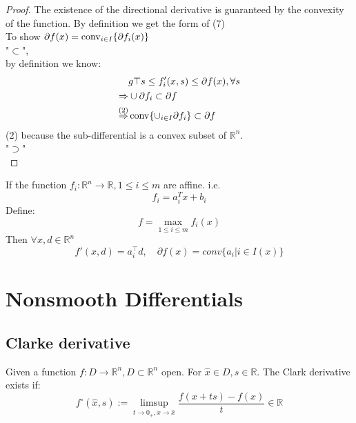 \begin{proof}
The existence of the directional derivative is guaranteed by the convexity of the function. By definition we get the form of (7)\\
To show $\partial f(x) = \operatorname*{conv}_{i \in I} \{ \partial f_i(x) \}$\\
"$\subset$", \\
by definition we know:
\begin{align*}
	&g\top s \leq f_i'(x, s) \leq \partial f(x), \forall s\\
	\Rightarrow & \cup \partial f_i \subset \partial f\\
	\overset{(2)}{\Rightarrow} & \operatorname*{conv}\{\cup_{i \in I} \partial f_i \} \subset \partial f
\end{align*}
(2) because the sub-differential is a convex subset of $\mathbb{R}^n$.\\
"$\supset$"\\
\end{proof}

\begin{corollary}
If the function $f_i:\mathbb{R}^n \longrightarrow \mathbb{R}, 1 \leq i \leq m$ are affine. i.e.
\begin{equation*}
	f_i = a_i^T x + b_i
\end{equation*}
Define:
\begin{equation*}
	f = \max_{1 \leq i \leq m} f_i(x)
\end{equation*}
Then $\forall x, d \in \mathbb{R}^n$
\begin{equation*}
	f'(x, d) = a_i^\top d, \quad \partial f(x) = conv\{a_i | i \in I(x)\}
\end{equation*}
\end{corollary}


\section{Nonsmooth Differentials}

\subsection{Clarke derivative}
\begin{definition}
	Given a function $f:D \longrightarrow \mathbb{R}^n, D \subset \mathbb{R}^n$ open. For $\hat{x} \in D, s \in \mathbb{R}$. The Clark derivative exists if:
	\begin{equation*}
		f^\circ(\hat{x}, s) := \limsup_{t \rightarrow 0_+, x \rightarrow \hat{x}} \frac{f(x + ts) - f(x)}{t} \in \mathbb{R}
	\end{equation*}
\end{definition}

